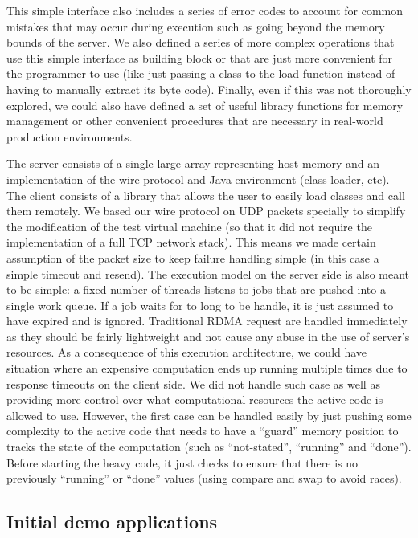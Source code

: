 \documentclass[10pt]{article}
\begin{document}
  This simple interface also includes a series of error codes to account for common mistakes that may occur during execution such as going beyond the memory bounds of the server. We also defined a series of more complex operations that use this simple interface as building block or that are just more convenient for the programmer to use (like just passing a class to the load function instead of having to manually extract its byte code). 
Finally, even if this was not thoroughly explored, we could also have defined a set of useful library functions for memory management or other convenient procedures that are necessary in real-world production environments.
  
   The server consists of a single large array representing host memory and
  an implementation of the wire protocol and Java environment (class
  loader, etc). The client consists of a library that allows the user
  to easily load classes and call them remotely. We based our wire protocol on UDP packets specially to simplify the modification of the test virtual machine (so that it did not require the implementation of a full TCP network stack). This means we made certain assumption of the packet size to keep failure handling simple (in this case a simple timeout and resend).
  The execution model on the server side is also meant to be simple: a fixed number of threads listens to jobs that are pushed into a single work queue. If a job waits for to long to be handle, it is just assumed to have expired and is ignored. Traditional RDMA request are handled immediately as they should be fairly lightweight and not cause any abuse in the use of server's resources. As a consequence of this execution architecture, we could have situation where an expensive computation ends up running multiple times due to response timeouts on the client side. We did not handle such case as well as providing more control over what computational resources the active code is allowed to use. However, the first case can be handled easily by just pushing some complexity to the active code that needs to have a ``guard'' memory position to tracks the state of the computation (such as ``not-stated'', ``running'' and ``done''). Before starting the heavy code, it just checks to ensure that there is no previously ``running'' or ``done'' values (using compare and swap to avoid races).

\subsection{Initial demo applications}
\end{document}
